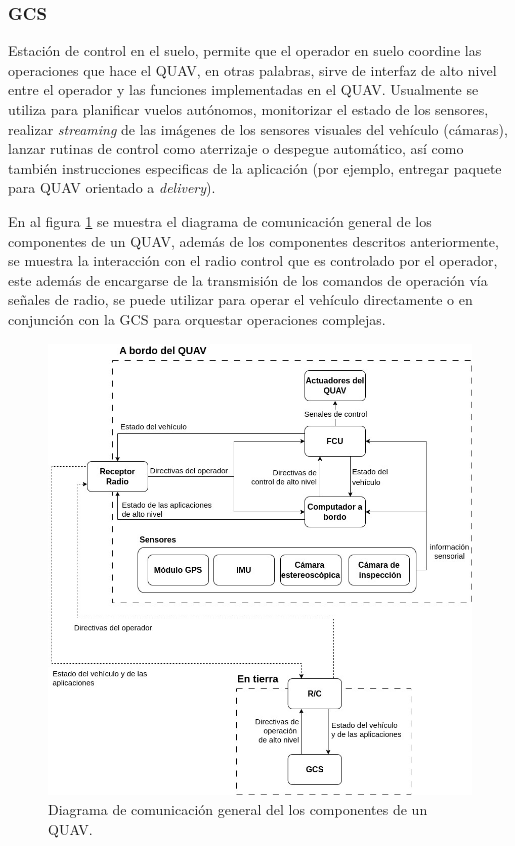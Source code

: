 \subsubsection{GCS}

Estación de control en el suelo, permite que el operador en suelo coordine las operaciones que hace el QUAV, en otras palabras, sirve de interfaz de alto nivel entre el operador y las funciones implementadas en el QUAV. Usualmente se utiliza para planificar vuelos autónomos, monitorizar el estado de los sensores, realizar \textit{streaming} de las imágenes de los sensores visuales del vehículo (cámaras), lanzar rutinas de control como aterrizaje o despegue automático, así como también instrucciones especificas de la aplicación (por ejemplo, entregar paquete para QUAV orientado a \textit{delivery}).

En al figura \ref{fig:QUAV-components} se muestra el diagrama de comunicación general de los componentes de un QUAV, además de los componentes descritos anteriormente, se muestra la interacción con el radio control que es controlado por el operador, este además de encargarse de la transmisión de los comandos de operación vía señales de radio, se puede utilizar para operar el vehículo directamente o en conjunción con la GCS para orquestar operaciones complejas. 

\begin{figure}[H]
    \centering
    \includegraphics[scale=0.45]{partes/ImgJoao/QUAV-components.jpg}
    \caption[Diagrama de comunicación general del los componentes de un QUAV.]{Diagrama de comunicación general del los componentes de un QUAV.} 
    \label{fig:QUAV-components}
\end{figure}

